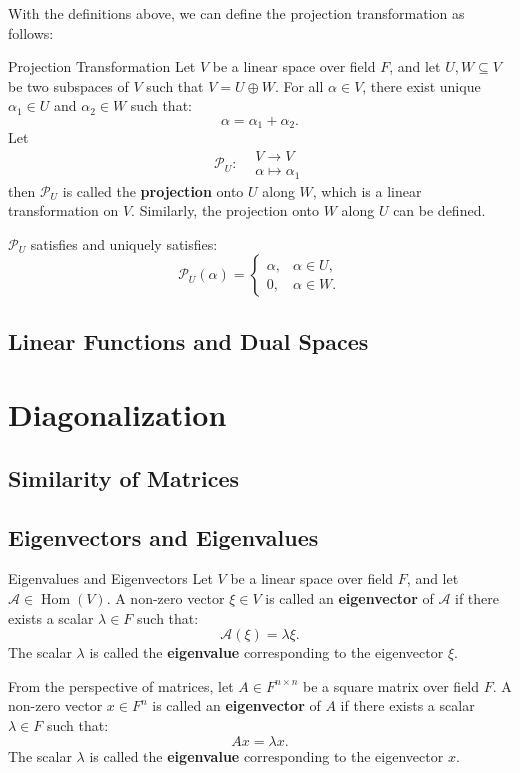 \documentclass[11pt]{../../TexTemplate/elegantbook} %
\begin{document}
With the definitions above, we can define the projection transformation as follows:
\begin{definition}{Projection Transformation}
    Let \( V \) be a linear space over field \( F \),
    and let \( U, W \subseteq V \) be two subspaces of \( V \) such that \( V = U \oplus W \).
    For all \( \alpha \in V \), there exist unique \( \alpha_1 \in U \) and \( \alpha_2 \in W \) such that:
    \[
    \alpha = \alpha_1 + \alpha_2.
    \]
    Let
    \[ 
        \mathcal{P}_{U}: 
        \begin{aligned}
        &V \to V \\
        &\alpha \mapsto \alpha_1
        \end{aligned}
    \] 
    then \( \mathcal{P}_{U} \) is called the \textbf{projection} onto \( U \) along \( W \),
    which is a linear transformation on \( V \).
    Similarly, the projection onto \( W \) along \( U \) can be defined.
\end{definition}
\( \mathcal{P}_{U}\) satisfies and uniquely satisfies:
\[
\mathcal{P}_{U}( \alpha ) = 
\begin{cases} 
    \alpha, & \alpha \in U, \\ 
    0, & \alpha \in W .
\end{cases}
\]



\section{Linear Functions and Dual Spaces}



\chapter{Diagonalization}
\section{Similarity of Matrices}
\section{Eigenvectors and Eigenvalues}
\begin{definition}{Eigenvalues and Eigenvectors}
    Let \( V \) be a linear space over field \( F \), 
    and let \( \mathcal{A}\in \operatorname{Hom}(V) \).
    A non-zero vector \( \xi \in V \) is called an \textbf{eigenvector} of \( \mathcal{A} \)
    if there exists a scalar \( \lambda \in F \) such that:
    \[
    \mathcal{A}(\xi) = \lambda \xi.
    \]
    The scalar \( \lambda \) is called the \textbf{eigenvalue} corresponding to the eigenvector \( \xi \).
    
    From the perspective of matrices,
    let \( A \in F^{n \times n} \) be a square matrix over field \( F \).
    A non-zero vector \( x \in F^n \) is called an \textbf{eigenvector} of \( A \)
    if there exists a scalar \( \lambda \in F \) such that:
    \[
    A x = \lambda x.
    \]
    The scalar \( \lambda \) is called the \textbf{eigenvalue} corresponding to the eigenvector \( x \).
\end{definition}
\end{document}
